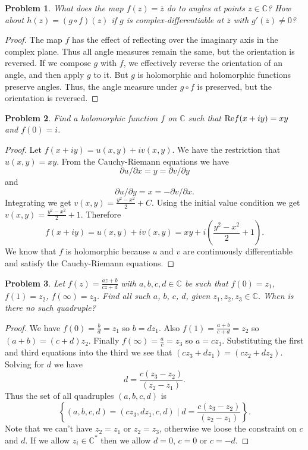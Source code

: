 \documentclass{article}
\newtheorem{problem}{Problem}
\begin{document}
\begin{problem}
What does the map $f(z) = \overline{z}$ do to angles at points $z \in \mathbb{C}$? How about $h(z) = (g \circ f)(z)$ if $g$ is complex-differentiable at $\overline{z}$ with $g'(\overline{z}) \neq 0$?
\end{problem}
\begin{proof}
The map $f$ has the effect of reflecting over the imaginary axis in the complex plane. Thus all angle measures remain the same, but the orientation is reversed. If we compose $g$ with $f$, we effectively reverse the orientation of an angle, and then apply $g$ to it. But $g$ is holomorphic and holomorphic functions preserve angles. Thus, the angle measure under $g \circ f$ is preserved, but the orientation is reversed.
\end{proof}

\begin{problem}
Find a holomorphic function $f$ on $\mathbb{C}$ such that $\textup{Re}f(x+iy) = xy$ and $f(0) = i$.
\end{problem}
\begin{proof}
Let $f(x+iy) = u(x,y) + iv(x,y)$. We have the restriction that $u(x,y) = xy$. From the Cauchy-Riemann equations we have
\[
\partial u / \partial x = y = \partial v / \partial y
\]
and
\[
\partial u / \partial y = x = -\partial v / \partial x.
\]
Integrating we get $v(x,y) = \frac{y^2 - x^2}{2} + C$. Using the initial value condition we get $v(x,y) = \frac{y^2 - x^2}{2} + 1$. Therefore
\[
f(x + iy) = u(x,y) + i v(x,y) = xy + i \left ( \frac{y^2-x^2}{2} + 1 \right ).
\]
We know that $f$ is holomorphic because $u$ and $v$ are continuously differentiable and satisfy the Cauchy-Riemann equations.
\end{proof}

\begin{problem}
Let $f(z) = \frac{az + b}{cz + d}$ with $a,b,c,d \in \mathbb{C}$ be such that $f(0) = z_1$, $f(1) = z_2$, $f(\infty) = z_3$. Find all such $a$, $b$, $c$, $d$, given $z_1, z_2, z_3 \in \mathbb{C}$. When is there no such quadruple?
\end{problem}
\begin{proof}
We have $f(0) = \frac{b}{d} = z_1$ so $b = d z_1$. Also $f(1) = \frac{a+b}{c+d} = z_2$ so $(a+b) = (c+d)z_2$. Finally $f(\infty) = \frac{a}{c} = z_3$ so $a = c z_3$. Substituting the first and third equations into the third we see that $(c z_3 + d z_1) = (c z_2 + d z_2)$. Solving for $d$ we have
\[
d = \frac{c(z_3 - z_2)}{(z_2 - z_1)}.
\]
Thus the set of all quadruples $(a,b,c,d)$ is
\[
\left \{ (a,b,c,d) = (c z_3, d z_1, c, d) \mid d = \frac{c(z_3 - z_2)}{(z_2 - z_1)} \right \}.
\]
Note that we can't have $z_2 = z_1$ or $z_2 = z_3$, otherwise we loose the constraint on $c$ and $d$. If we allow $z_i \in \mathbb{C}^*$ then we allow $d = 0$, $c = 0$ or $c = -d$.
\end{proof}
\end{document}
